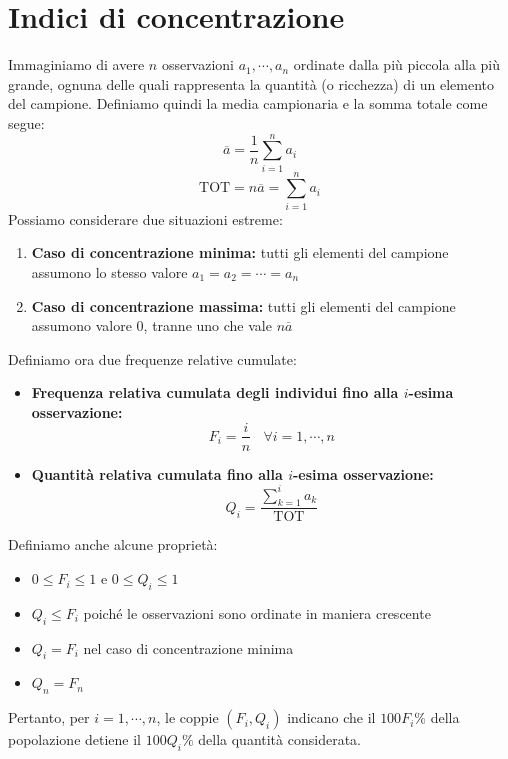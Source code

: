 \documentclass[11pt]{report}
\begin{document}
\section{Indici di concentrazione}
Immaginiamo di avere $n$ osservazioni $a_1, \cdots, a_n$ ordinate dalla più piccola alla più grande, ognuna delle quali rappresenta la quantità (o ricchezza) di un elemento del campione. Definiamo quindi la media campionaria e la somma totale come segue:
\begin{equation}
    \overline{a} = \frac{1}{n} \sum_{i=1}^{n} a_i
\end{equation}
\begin{equation}
    \text{TOT} = n \overline{a} = \sum_{i=1}^{n} a_i
\end{equation}
Possiamo considerare due situazioni estreme:
\begin{enumerate}
    \item \textbf{Caso di concentrazione minima:} tutti gli elementi del campione assumono lo stesso valore $a_1 = a_2 = \cdots = a_n$
    \item \textbf{Caso di concentrazione massima:} tutti gli elementi del campione assumono valore 0, tranne uno che vale $n \overline{a}$
\end{enumerate}
Definiamo ora due frequenze relative cumulate:
\begin{itemize}
    \item \textbf{Frequenza relativa cumulata degli individui fino alla $i$-esima osservazione:}
    \begin{equation}
        F_i = \frac{i}{n}\ \ \ \ \forall i=1, \cdots, n
    \end{equation}

    \item \textbf{Quantità relativa cumulata fino alla $i$-esima osservazione:}
    \begin{equation}
        Q_i = \frac{\sum_{k=1}^{i} a_k}{\text{TOT}}
    \end{equation}
\end{itemize}
Definiamo anche alcune proprietà:
\begin{itemize}
    \item $0 \leq F_i \leq 1$ e $0 \leq Q_i \leq 1$
    \item $Q_i \leq F_i$ poiché le osservazioni sono ordinate in maniera crescente
    \item $Q_i = F_i$ nel caso di concentrazione minima
    \item $Q_n = F_n$
\end{itemize}
Pertanto, per $i = 1, \cdots, n$, le coppie $(F_i, Q_i)$ indicano che il $100F_i\%$ della popolazione detiene il $100Q_i\%$ della quantità considerata.
\end{document}
